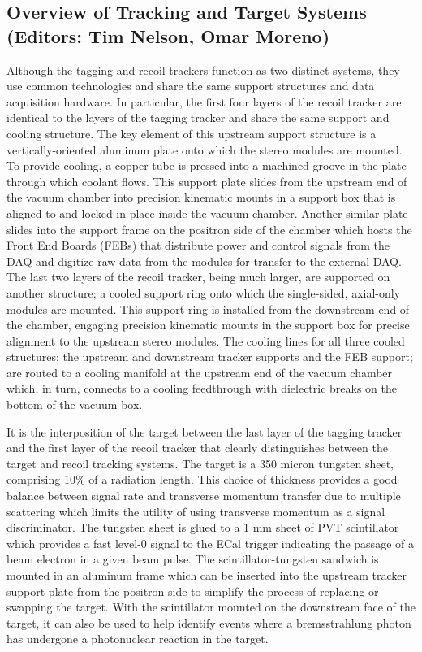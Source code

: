 \subsection{Overview of Tracking and Target Systems (Editors: Tim Nelson, Omar Moreno)}

Although the tagging and recoil trackers function as two distinct systems, they use common technologies and share the same support structures and data acquisition hardware.  In particular, the first four layers of the recoil tracker are identical to the layers of the tagging tracker and share the same support and cooling structure.  The key element of this upstream support structure is a vertically-oriented aluminum plate onto which the stereo modules are mounted.  To provide cooling, a copper tube is pressed into a machined groove in the plate through which coolant flows.  This support plate slides from the upstream end of the vacuum chamber into precision kinematic mounts in a support box that is aligned to and locked in place inside the vacuum chamber.  Another similar plate slides into the support frame on the positron side of the chamber which hosts the Front End Boards (FEBs) that distribute power and control signals from the DAQ and digitize raw data from the modules for transfer to the external DAQ.  The last two layers of the recoil tracker, being much larger, are supported on another structure; a cooled support ring onto which the single-sided, axial-only modules are mounted. This support ring is installed from the downstream end of the chamber, engaging precision kinematic mounts in the support box for precise alignment to the upstream stereo modules. The cooling lines for all three cooled structures; the upstream and downstream tracker supports and the FEB support; are routed to a cooling manifold at the upstream end of the vacuum chamber which, in turn, connects to a cooling feedthrough with dielectric breaks on the bottom of the vacuum box.

It is the interposition of the target between the last layer of the tagging tracker and the first layer of the recoil tracker that clearly distinguishes between the target and recoil tracking systems. The target is a 350 micron tungsten sheet, comprising 10\% of a radiation length. This choice of thickness provides a good balance between signal rate and transverse momentum transfer due to multiple scattering which limits the utility of using transverse momentum as a signal discriminator. The tungsten sheet is glued to a 1 mm sheet of PVT scintillator which provides a fast level-0 signal to the ECal trigger indicating the passage of a beam electron in a given beam pulse.  The scintillator-tungsten sandwich is mounted in an aluminum frame which can be inserted into the upstream tracker support plate from the positron side to simplify the process of replacing or swapping the target.  With the scintillator mounted on the downstream face of the target, it can also be used to help identify events where a bremsstrahlung photon has undergone a photonuclear reaction in the target.

